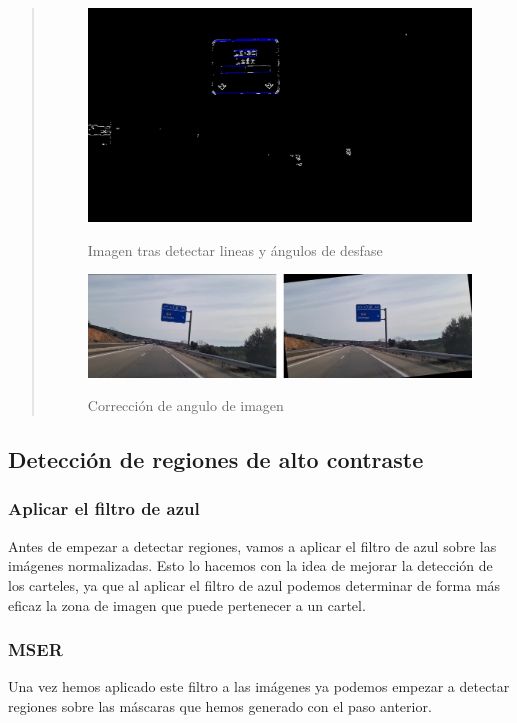 \documentclass[a4paper, 12pt]{article}
\begin{document}
\begin{quote}
	\begin{figure}[h]
		\centering
		\caption{Imagen tras detectar lineas y ángulos de desfase}\vspace{0.5cm}
		\includegraphics[width=0.6\linewidth]{img/image_with_lines+}
		\label{fig:imagewithlines}
	\end{figure}
	
	\begin{figure}[h]
		\centering
		\caption{Corrección de angulo de imagen}\vspace{0.5cm}
		\includegraphics[width=0.7\linewidth]{img/00057_co}
		\label{fig:00057co}
	\end{figure}
	
\end{quote}

\subsection{Detección de regiones de alto contraste}
\subsubsection{Aplicar el filtro de azul}
Antes de empezar a detectar regiones, vamos a aplicar el filtro de azul sobre las imágenes normalizadas. Esto lo hacemos con la idea de mejorar la detección de los carteles, ya que al aplicar el filtro de azul podemos determinar de forma más eficaz la zona de imagen que puede pertenecer a un cartel. 

\subsubsection{MSER}
Una vez hemos aplicado este filtro a las imágenes ya podemos empezar a detectar regiones sobre las máscaras que hemos generado con el paso anterior.
\end{document}
